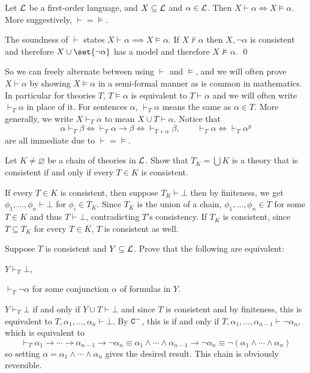     Let ${\cal L}$ be a first-order language, and $X\subseteq{\cal L}$ and $\alpha\in{\cal L}$.
    Then $X\vdash\alpha\iff X\vDash\alpha$.
    More suggestively, ${\vdash}={\vDash}$.

\ethrm

The soundness of $\vdash$ states $X\vdash\alpha\implies X\vDash\alpha$.
If $X\nvdash\alpha$ then $X,\neg\alpha$ is consistent and therefore $X\cup\set{\neg\alpha}$ has a model and therefore $X\nvDash\alpha$.
\qed

So we can freely alternate between using $\vdash$ and $\vDash$, and we will often prove $X\vdash\alpha$ by showing $X\vDash\alpha$ in a semi-formal manner as is common in mathematics.
In particular for theories $T$, $T\vDash\alpha$ is equivalent to $T\vdash\alpha$ and we will often write $\vdash_T\alpha$ in place of it.
For sentences $\alpha$, $\vdash_T\alpha$ means the same as $\alpha\in T$.
More generally, we write $X\vdash_T\alpha$ to mean $X\cup T\vdash\alpha$.
Notice that
$$ \alpha\vdash_T\beta \iff \vdash_T\alpha\to\beta \iff \vdash_{T+\alpha}\beta,\qquad \vdash_T\alpha \iff \vdash_T\alpha^g $$
are all immediate due to ${\vdash}={\vDash}$.

\bexerc

    Let $K\neq\varnothing$ be a chain of theories in ${\cal L}$.
    Show that $T_K=\bigcup K$ is a theory that is consistent if and only if every $T\in K$ is consistent.

\eexerc

If every $T\in K$ is consistent, then suppose $T_K\vdash\bot$ then by finiteness, we get $\phi_1,\dots,\phi_n\vdash\bot$ for $\phi_i\in T_K$.
Since $T_K$ is the union of a chain, $\phi_1,\dots,\phi_n\in T$ for some $T\in K$ and thus $T\vdash\bot$, contradicting $T$'s consistency.
If $T_K$ is consistent, since $T\subseteq T_K$ for every $T\in K$, $T$ is consistent as well.

\bexerc

    Suppose $T$ is consistent and $Y\subseteq{\cal L}$.
    Prove that the following are equivalent:
    \benum
        \item $Y\vdash_T\bot$,
        \item $\vdash_T\neg\alpha$ for some conjunction $\alpha$ of formulas in $Y$.
    \eenum

\eexerc

$Y\vdash_T\bot$ if and only if $Y\cup T\vdash\bot$ and since $T$ is consistent and by finiteness, this is equivalent to $T,\alpha_1,\dots,\alpha_n\vdash\bot$.
By ${\tt C}^-$, this is if and only if $T,\alpha_1,\dots,\alpha_{n-1}\vdash\neg\alpha_n$, which is equivalent to
$$ \vdash_T\alpha_1\to\cdots\to\alpha_{n-1}\to\neg\alpha_n \equiv \alpha_1\land\cdots\land\alpha_{n-1}\to\neg\alpha_n \equiv \neg(\alpha_1\land\cdots\land\alpha_n) $$
so setting $\alpha=\alpha_1\land\cdots\land\alpha_n$ gives the desired result.
This chain is obviously reversible.

